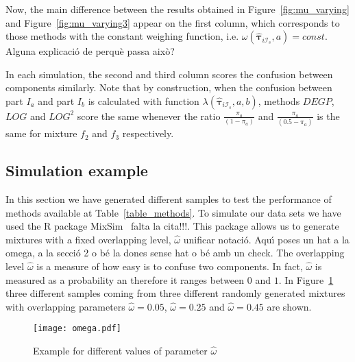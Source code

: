 \documentclass[10pt, a4paper]{article}
\newcommand{\m}[1]{\boldsymbol{#1}}
\begin{document}
Now, the main difference between the results obtained in Figure~\ref{fig:mu_varying} and Figure~\ref{fig:mu_varying3} appear on the first column, which corresponds to those methods with the constant weighing function, i.e. $\omega(\hat{\m \tau}_{i \mathcal{I}_s}, a) = const$. {\color{blue} Alguna explicaci\'{o} de perqu\`{e} passa aix\`{o}?}

In each simulation, the second and third column scores the confusion between components similarly. Note that by construction, when the confusion between part $I_a$ and part $I_b$ is calculated with function $\lambda(\hat{\m \tau}_{i \mathcal{I}_s}, a, b)$, methods $DEGP$, $LOG$ and $LOG^2$ score the same whenever the ratio $\frac{\pi_a}{(1 - \pi_a)}$ and $\frac{\pi_a}{(0.5 - \pi_a)}$ is the same for mixture $f_2$ and $f_3$ respectively.


\subsection{Simulation example}

In this section we have generated different samples to test the performance of methods available at Table~\ref{table_methods}. To simulate our data sets we have used the R package MixSim~\citep{Citar mixxim} {\color{blue} falta la cita!!!}. This package allows us to generate mixtures with a fixed overlapping level, $\hat{\omega}$ {\color{blue} unificar notaci\'{o}. Aqu\'{\i} poses un hat a la omega, a la secci\'{o} 2 o b\'{e} la dones sense hat o b\'{e} amb un check}. The overlapping level $\hat{\omega}$ is a measure of how easy is to confuse two components. In fact,  $\hat{\omega}$ is measured as a probability an therefore it ranges between $0$ and $1$. In Figure~\ref{omega} three different samples coming from three different randomly generated mixtures with overlapping parameters  $\hat{\omega}=0.05$, $\hat{\omega}=0.25$ and $\hat{\omega}=0.45$ are shown.

\begin{figure}[!t]
\centering
\texttt{[image: omega.pdf]}
\caption{Example for different values of parameter $\hat{\omega}$}
\label{omega}
\end{figure}
\end{document}
